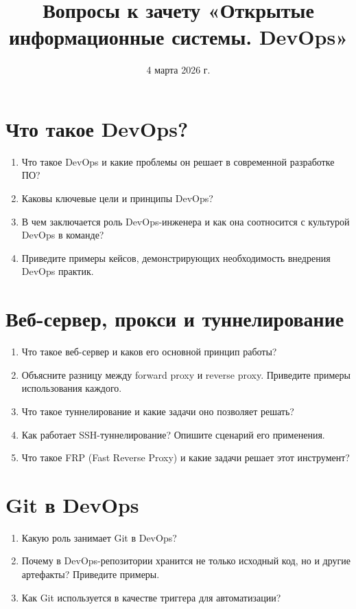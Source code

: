 \documentclass[12pt,a4paper]{article}
\title{Вопросы к зачету «Открытые информационные системы. DevOps»}
\date{4 марта 2026 г.}
\begin{document}
\maketitle

\section{Что такое DevOps?}
\begin{enumerate}
    \item Что такое DevOps и какие проблемы он решает в современной разработке ПО?
    \item Каковы ключевые цели и принципы DevOps?
    \item В чем заключается роль DevOps-инженера и как она соотносится с культурой DevOps в команде?
    \item Приведите примеры кейсов, демонстрирующих необходимость внедрения DevOps практик.
\end{enumerate}

\section{Веб-сервер, прокси и туннелирование}
\begin{enumerate}
    \item Что такое веб-сервер и каков его основной принцип работы?
    \item Объясните разницу между forward proxy и reverse proxy. Приведите примеры использования каждого.
    \item Что такое туннелирование и какие задачи оно позволяет решать?
    \item Как работает SSH-туннелирование? Опишите сценарий его применения.
    \item Что такое FRP (Fast Reverse Proxy) и какие задачи решает этот инструмент?
\end{enumerate}

\section{Git в DevOps}
\begin{enumerate}
    \item Какую роль занимает Git в DevOps?
    \item Почему в DevOps-репозитории хранится не только исходный код, но и другие артефакты? Приведите примеры.
    \item Как Git используется в качестве триггера для автоматизации?
\end{enumerate}
\end{document}
